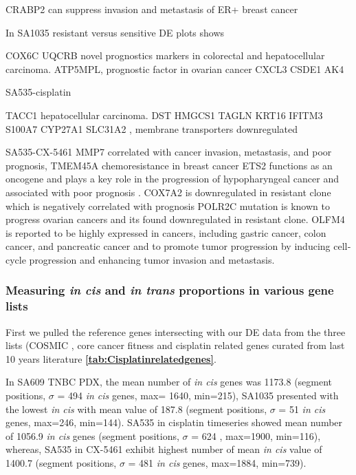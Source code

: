 CRABP2 can suppress invasion and metastasis of ER+ breast cancer 


 
In SA1035 resistant versus sensitive DE plots shows  


 COX6C \cite{yang2018overexpression,chang2017estrogen}
 UQCRB \cite{kim2017mitochondrial,park2017mitochondrial} novel prognostics markers in colorectal and hepatocellular carcinoma.
 ATP5MPL, prognostic factor in ovarian cancer
 CXCL3 \cite{gui2016overexpression, karin2020cxcr3}
CSDE1 \cite{martinez2019unr}
AK4 \cite{jan2019co}


SA535-cisplatin

TACC1 \cite{shakya2018high} hepatocellular carcinoma.
DST  \cite{salerno2016human}
HMGCS1 \cite{walsh2020mevalonate}
TAGLN \cite{wu2014transgelin, elsafadi2020transgelin}
KRT16 \cite{huang2019novel}
IFITM3 \cite{liu2019ifitm3}
S100A7 \cite{zhang2019clinical, mayama2018olfm}
CYP27A1  \cite{liang2019cyp27a1, wu201327}
SLC31A2 \cite{bai2017structural}, membrane transporters downregulated

SA535-CX-5461
MMP7 \cite{mcgowan2008matrix} correlated with cancer invasion, metastasis, and poor prognosis,
TMEM45A \cite{schmit2019characterization} chemoresistance in breast cancer
ETS2 \cite{ge2008role} functions as an oncogene and plays a key role in the progression of hypopharyngeal cancer and associated with poor prognosis \cite{fu2017high}.
COX7A2 \cite{deng2018overexpression} is downregulated in resistant clone which is negatively correlated with prognosis
POLR2C \cite {moriwaki2017polr2c} mutation is known to progress ovarian cancers and its found downregulated in resistant clone.
OLFM4 \cite{ashizawa2019olfm4} is reported to be highly expressed in cancers, including gastric cancer, colon cancer, and pancreatic cancer and to promote tumor progression by inducing cell‐cycle progression and enhancing tumor invasion and metastasis.


\subsubsection{Measuring \textit{in cis} and \textit{in trans} proportions in various gene lists}
First we pulled the reference genes  intersecting with our \ac{DE} data from the three lists (COSMIC \cite{vogelstein2013cancer}, core cancer fitness \cite{behan2019prioritization} and cisplatin related genes curated from last 10 years literature \textbf{\autoref{tab:Cisplatinrelatedgenes}}.

 In  SA609 TNBC PDX, the mean number of \textit{in cis} genes was 1173.8 (segment positions, $\sigma$ = 494 \textit{in cis} genes, max= 1640, min=215), SA1035 presented with the lowest \textit{in cis} with
 mean value of 187.8 (segment positions, $\sigma$ = 51 \textit{in cis} genes, max=246, min=144). SA535 in cisplatin timeseries showed mean number of 1056.9 \textit{in cis} genes (segment positions, $\sigma$ = 624 , max=1900, min=116), whereas, SA535 in CX-5461 exhibit highest number of mean \textit{in cis} value of 1400.7 (segment positions, $\sigma$ = 481 \textit{in cis} genes, max=1884, min=739).
 
